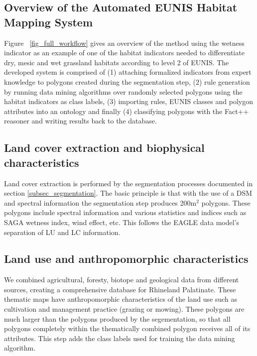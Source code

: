 \documentclass[authoryear, review,12pt,number]{elsarticle}
\begin{document}
\subsection{Overview of the Automated EUNIS Habitat Mapping System}
Figure ~\ref{fig_full_workflow} gives an overview of the method using the 
wetness indicator as an example of one of the habitat indicators needed to 
differentiate dry, mesic and wet grassland habitats according to level 2 of 
EUNIS. The developed system is comprised of (1) attaching
formalized indicators from expert knowledge to polygons created during the 
segmentation step,
(2) rule generation by running data mining algorithms over randomly selected
polygons using the habitat indicators as class labels, (3) importing rules,
EUNIS classes and polygon attributes into an ontology and finally (4)
classifying polygons with the Fact++ reasoner \citep{Tsarkov2006} and writing
results back to the database. 

\subsection{Land cover extraction and biophysical characteristics}
Land cover extraction is performed by the segmentation processes documented in  
section \ref{subsec_segmentation}. The basic principle is that with the use of 
a DSM and spectral information the segmentation step produces 200m$^{2}$ 
polygons. These polygons include spectral information and various statistics 
and indices such as SAGA wetness index, wind effect, etc.   
This follows the EAGLE data model's separation of LU and LC information.

\subsection{Land use and anthropomorphic characteristics}
We combined agricultural, foresty, biotope and geological data from different 
sources, creating a comprehensive database for Rhineland Palatinate. These 
thematic maps have anthropomorphic characteristics of the land use such as 
cultivation and management practice (grazing or mowing). These polygons are 
much larger than the polygons produced by the segementation, so that all 
polygons completely within the thematically combined polygon receives all of 
its attributes. This step adds the class labels used for training the data 
mining algorithm. 
\end{document}
